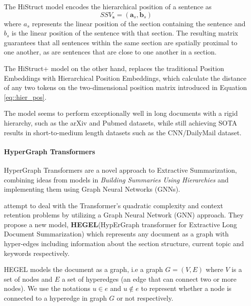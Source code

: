 \documentclass[preprint,review,12pt]{elsarticle}
\begin{document}
The HiStruct model encodes the hierarchical position of a sentence as 
\begin{equation}
\label{eq::hier_pos}
    SSV_{\mathbf{s}} = (\mathbf{a}_{s}, \mathbf{b}_{s})
\end{equation}
where $a_{s}$ represents the linear position of the section containing the sentence and $b_{s}$ is the linear position of the sentence with that section. The resulting matrix guarantees that all sentences within the same section are spatially proximal to one another, as are sentences that are close to one another in a section. 

The HiStruct+ model on the other hand, replaces the traditional Position Embeddings with Hierarchical Position Embeddings, which calculate the distance of any two tokens on the two-dimensional position matrix introduced in Equation \ref{eq::hier_pos}. 

The model seems to perform exceptionally well in long documents with a rigid hierarchy, such as the arXiv and Pubmed datasets, while still achieving SOTA results in short-to-medium length datasets such as the CNN/DailyMail dataset.


\paragraph{HyperGraph Transformers} HyperGraph Transformers are a novel approach to Extractive Summarization, combining ideas from models in \textit{Building Summaries Using Hierarchies} and implementing them using Graph Neural Networks (GNNs).


\citet{hegel} attempt to deal with the Transformer's quadratic complexity and context retention problems by utilizing a Graph Neural Network (GNN) approach. They propose a new model, \textbf{HEGEL}(HypErGraph transformer for Extractive Long Document Summarization) which represents any document as a graph with hyper-edges including information about the section structure, current topic and keywords respectively. 

HEGEL models the document as a graph, i.e a graph $G = (V, E)$ where $V$ is a set of nodes and $E$ a set of hyperedges (an edge that can connect two or more nodes). We use the notations $u \in e$ and $u \notin e$ to represent whether a node is connected to a hyperedge in graph $G$ or not respectively.
\end{document}
